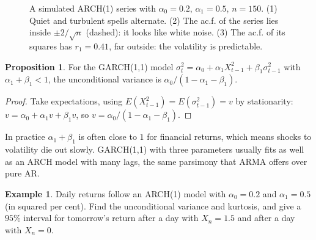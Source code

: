 \documentclass[11pt,a4paper]{article}
\theoremstyle{definition}
\newtheorem{exa}[thm]{Example}
\newtheorem{prop}[thm]{Proposition}
\begin{document}
\begin{figure}[H]
\caption{A simulated ARCH(1) series with $\alpha_0 = 0.2$, $\alpha_1 = 0.5$, $n = 150$. (1) Quiet and turbulent spells alternate. (2) The ac.f. of
the series lies inside $\pm2/\sqrt n$ (dashed): it looks like white noise. (3) The ac.f. of its squares has $r_1 = 0.41$, far outside:
the volatility is predictable.}
\label{fig:arch}
\end{figure}

\begin{prop}\label{prop:garch-var}
For the GARCH(1,1) model $\sigma_t^2 = \alpha_0 + \alpha_1X_{t-1}^2 + \beta_1\sigma_{t-1}^2$ with $\alpha_1 + \beta_1 < 1$, the unconditional variance is $\alpha_0/(1 - \alpha_1 - \beta_1)$.
\end{prop}

\begin{proof}
Take expectations, using $E(X_{t-1}^2) = E(\sigma_{t-1}^2) = v$ by stationarity: $v = \alpha_0 + \alpha_1v + \beta_1v$, so $v = \alpha_0/(1 - \alpha_1 - \beta_1)$.
\end{proof}

In practice $\alpha_1 + \beta_1$ is often close to $1$ for financial returns, which means shocks to volatility die out slowly. GARCH(1,1)
with three parameters usually fits as well as an ARCH model with many lags, the same parsimony that ARMA
offers over pure AR.

\begin{exa}\label{exa:arch-forecast}
Daily returns follow an ARCH(1) model with $\alpha_0 = 0.2$ and $\alpha_1 = 0.5$ (in squared per cent). Find the unconditional variance and
kurtosis, and give a $95\%$ interval for tomorrow's return after a day with $X_n = 1.5$ and after a day with $X_n = 0$.
\end{exa}
\end{document}
